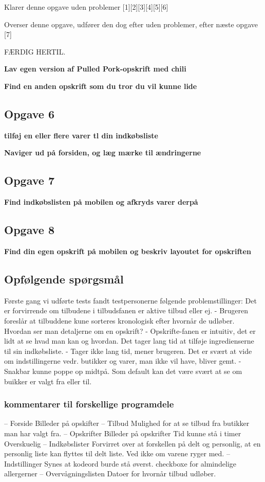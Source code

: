 Klarer denne opgave uden problemer [1][2][3][4][5][6]

Overser denne opgave, udfører den dog efter uden problemer, efter næste opgave [7]   

FÆRDIG HERTIL. 

\textbf{Lav egen version af Pulled Pork-opskrift med chili}


\textbf{Find en anden opskrift som du tror du vil kunne lide}

\subsection{Opgave 6}
\textbf{tilføj en eller flere varer tl din indkøbsliste}

\textbf{Naviger ud på forsiden, og læg mærke til ændringerne}

\subsection{Opgave 7}
\textbf{Find indkøbslisten på mobilen og afkryds varer derpå}

\subsection{Opgave 8}
\textbf{Find din egen opskrift på mobilen og beskriv layoutet for opskriften}


\subsection{Opfølgende spørgsmål}
Første gang vi udførte tests fandt testpersonerne følgende problemstillinger:
Det er forvirrende om tilbudene i tilbudsfanen er aktive tilbud eller ej.
 - Brugeren foreslår at tilbuddene kune sorteres kronologisk efter hvornår de udløber.
Hvordan ser man detaljerne om en opskrift?
 - Opskrifte-fanen er intuitiv, det er lidt at se hvad man kan og hvordan.
Det tager lang tid at tilføje ingredienserne til sin indkøbsliste.
 - Tager ikke lang tid, mener brugeren.
Det er svært at vide om indstillingerne vedr. butikker og varer, man ikke vil have, bliver gemt.
 - Snakbar kunne poppe op midtpå. Som default kan det være svært at se om buikker er valgt fra eller til.
\subsubsection{kommentarer til forskellige programdele}
– Forside
	Billeder på opskifter
– Tilbud
	Mulighed for at se tilbud fra butikker man har valgt fra.
– Opskrifter
	Billeder på opskrifter
	Tid kunne stå i timer
	Overskuelig
– Indkøbslister
	Forvirret over at forskellen på delt og personlig, at en personlig liste kan flyttes til delt liste. Ved ikke om varene ryger med.
– Indstillinger
Synes at kodeord burde stå øverst.
checkboxe for almindelige allergerner
– Overvågningslisten
	Datoer for hvornår tilbud udløber.

